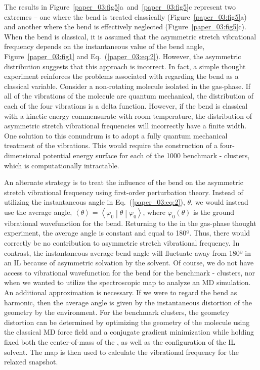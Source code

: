\documentclass[]{article}
\begin{document}
The results in Figure~\ref{paper_03:fig5}a~and~\ref{paper_03:fig5}c represent two extremes -- one where the  bend is treated classically (Figure~\ref{paper_03:fig5}a) and another where the  bend is effectively neglected (Figure~\ref{paper_03:fig5}c).  When the  bend is classical, it is assumed that the  asymmetric stretch vibrational frequency depends on the instantaneous value of the bend angle, Figure~\ref{paper_03:fig1} and Eq.~(\ref{paper_03:eq:2}).  However, the asymmetric distribution suggests that this approach is incorrect. In fact, a simple thought experiment reinforces the problems associated with regarding the  bend as a classical variable. Consider a non-rotating  molecule isolated in the gas-phase. If all of the vibrations of the  molecule are quantum mechanical, the distribution of each of the four vibrations is a delta function. However, if the bend is classical with a kinetic energy commensurate with room temperature, the distribution of asymmetric stretch vibrational frequencies will incorrectly have a finite width. One solution to this conundrum is to adopt a fully quantum mechanical treatment of the  vibrations. This would require the construction of a four-dimensional potential energy surface for each of the 1000 benchmark -\ce{[C4C1im][PF6]} clusters, which is computationally intractable.

An alternate strategy is to treat the influence of the  bend on the asymmetric stretch vibrational frequency using first-order perturbation theory. Instead of utilizing the instantaneous  angle in Eq.~(\ref{paper_03:eq:2}), \(\theta\), we would instead use the average angle, \(\left\langle \theta \right\rangle = \left\langle \varphi_{0} \middle| \theta \middle| \varphi_{0} \right\rangle\), where \(\varphi_{0}(\theta)\) is the ground vibrational wavefunction for the  bend. Returning to the  in the gas-phase thought experiment, the average angle is constant and equal to 180º. Thus, there would correctly be no contribution to  asymmetric stretch vibrational frequency. In contrast, the instantaneous average bend angle will fluctuate away from 180º in an IL because of asymmetric solvation by the solvent. Of course, we do not have access to vibrational wavefunction for the  bend for the benchmark -\ce{[C4C1im][PF6]} clusters, nor when we wanted to utilize the spectroscopic map to analyze an MD simulation. An additional approximation is necessary. If we were to regard the  bend as harmonic, then the average angle is given by the instantaneous distortion of the  geometry by the environment. For the benchmark clusters, the geometry distortion can be determined by optimizing the geometry of the  molecule using the classical MD force field and a conjugate gradient minimization while holding fixed both the center-of-mass of the , as well as the configuration of the IL solvent. The map is then used to calculate the vibrational frequency for the relaxed snapshot.
\end{document}
